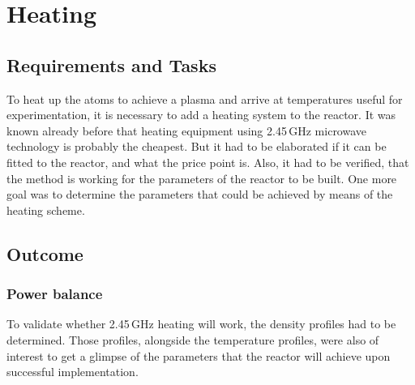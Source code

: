 \section{Heating}
\subsection{Requirements and Tasks}

To heat up the atoms to achieve a plasma and arrive at temperatures useful for experimentation, it is necessary to add a heating system to the reactor.
It was known already before that heating equipment using 2.45\,GHz microwave technology is probably the cheapest.
But it had to be elaborated if it can be fitted to the reactor, and what the price point is.
Also, it had to be verified, that the method is working for the parameters of the reactor to be built.
One more goal was to determine the parameters that could be achieved by means of the heating scheme.

\subsection{Outcome}
\subsubsection{Power balance}   %
To validate whether 2.45\,GHz heating will work, the density profiles had to be determined.
Those profiles, alongside the temperature profiles, were also of interest to get a glimpse of the parameters that the reactor will achieve upon successful implementation.




